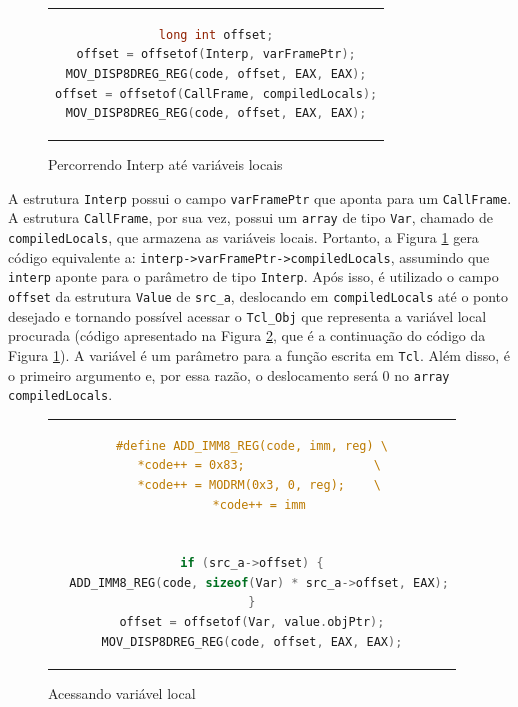 \begin{figure}[ht!]
  \centering
  \begin{tabular}{c}
    \begin{lstlisting}[language=C]
long int offset;
offset = offsetof(Interp, varFramePtr);
MOV_DISP8DREG_REG(code, offset, EAX, EAX);
offset = offsetof(CallFrame, compiledLocals);
MOV_DISP8DREG_REG(code, offset, EAX, EAX);
    \end{lstlisting}
  \end{tabular}
  \caption{Percorrendo Interp até variáveis locais\label{goto-varstruct}}
\end{figure}


A estrutura \verb!Interp! possui o campo \verb!varFramePtr! que
aponta para um \verb!CallFrame!. 
A estrutura \verb!CallFrame!, por sua vez, possui um
\verb!array! de tipo \verb!Var!, chamado de \verb!compiledLocals!,
que armazena as variáveis locais. Portanto, a Figura
\ref{goto-varstruct} gera código equivalente a:
\verb!interp->varFramePtr->compiledLocals!, assumindo
que \verb!interp! aponte para o parâmetro de tipo
\verb!Interp!. Após isso, é utilizado o campo
\verb!offset! da estrutura \verb!Value! de \verb!src_a!, deslocando em
\verb!compiledLocals! até o ponto desejado e tornando possível acessar
o \verb!Tcl_Obj! que representa a variável local procurada (código
apresentado na Figura \ref{goto-localvar}, que é a continuação do
código da Figura \ref{goto-varstruct}). A
variável é um parâmetro para a função
escrita em \texttt{Tcl}. Além disso, é o primeiro argumento e, por
essa razão, o deslocamento será 0 no \verb!array! \verb!compiledLocals!.

\begin{figure}[h]
  \centering
  \begin{tabular}{c}
    \begin{lstlisting}[language=C]
#define ADD_IMM8_REG(code, imm, reg) \
  *code++ = 0x83;                  \
  *code++ = MODRM(0x3, 0, reg);    \
  *code++ = imm


if (src_a->offset) {
  ADD_IMM8_REG(code, sizeof(Var) * src_a->offset, EAX);
}
offset = offsetof(Var, value.objPtr);
MOV_DISP8DREG_REG(code, offset, EAX, EAX);
    \end{lstlisting}
  \end{tabular}
  \caption{Acessando variável local\label{goto-localvar}}
\end{figure}

